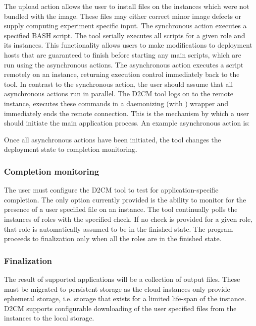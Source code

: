 \documentclass[a4paper,10pt]{article}
\begin{document}
The upload action allows the user to install files on the instances which were not bundled with the image. These files may either correct minor image defects or supply computing experiment specific input. The synchronous action executes a specified BASH script. The tool serially executes all scripts for a given role and its instances. This functionality allows users to make modifications to deployment hosts that are guaranteed to finish before starting any main scripts, which are run using the asynchronous actions. The asynchronous action executes a script remotely on an instance, returning execution control immediately back to the tool. In contrast to the synchronous action, the user should assume that all asynchronous actions run in parallel. The D2CM tool logs on to the remote instance, executes these commands in a daemonizing (with ) wrapper and immediately ends the remote connection. This is the mechanism by which a user should initiate the main application process. An example asynchronous action is:



Once all asynchronous actions have been initiated, the tool changes the deployment state to completion monitoring.

\subsubsection{Completion monitoring}

The user must configure the D2CM tool to test for application-specific completion. The only option currently provided is the ability to monitor for the presence of a user specified file on an instance. The tool continually polls the instances of roles with the specified check. If no check is provided for a given role, that role is automatically assumed to be in the finished state. The program proceeds to finalization only when all the roles are in the finished state.

\subsubsection{Finalization}

The result of supported applications will be a collection of output files. These must be migrated to persistent storage as the cloud instances only provide ephemeral storage, i.e. storage that exists for a limited life-span of the instance. D2CM supports configurable downloading of the user specified files from the instances to the local storage. 
\end{document}
